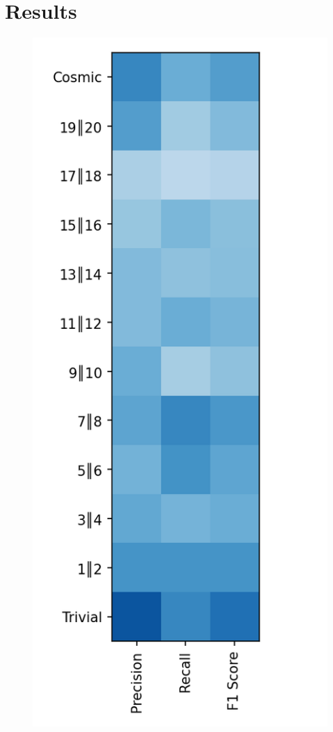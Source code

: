 \documentclass{article}
\begin{document}
\hypertarget{results}{%
\section{Results}}
	\begin{figure}[ht]
		\begin{minipage}[b]{0.32\linewidth}
			\centering
			\includegraphics[width=\linewidth]{12 - AdaBoost.png} 

\end{minipage}
\end{figure}
\end{document}
